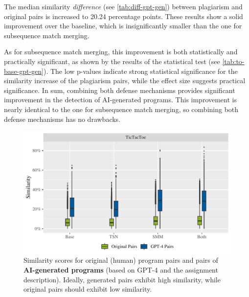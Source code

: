 The median similarity \textit{difference} (see \autoref{tab:diff-gpt-gen}) between plagiarism and original pairs is increased to 20.24 percentage points.
These results show a solid improvement over the baseline, which is insignificantly smaller than the one for subsequence match merging. 

As for subsequence match merging, this improvement is both statistically and practically significant, as shown by the results of the statistical test (see \autoref{tab:to-base-gpt-gen}).
The low p-values indicate strong statistical significance for the similarity increase of the plagiarism pairs, while the effect size suggests practical significance.
In sum, combining both defense mechanisms provides significant improvement in the detection of AI-generated programs.
This improvement is nearly identical to the one for subsequence match merging, so combining both defense mechanisms has no drawbacks.



\begin{figure}
\centering
\includegraphics[width=\linewidth]{figures/disseval/eval-chatgpt-full_avg.similarity.pdf}
\caption[Evaluation Results: AI-based Generation]{Similarity scores for original (human) program pairs and pairs of \textbf{AI-generated programs} (based on GPT-4 and the assignment description). Ideally, generated pairs exhibit high similarity, while original pairs should exhibit low similarity.}
\label{fig:stage4-results}
\end{figure}

